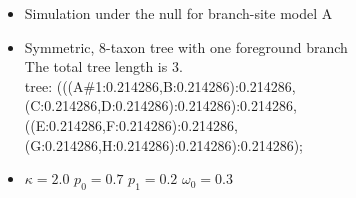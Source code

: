 \documentclass[12pt,letterpaper]{article}\usepackage[]{graphicx}\usepackage[]{color}
\newenvironment{knitrout}{}{} %
\begin{document}
\begin{itemize}
\item Simulation under the null for branch-site model A
\item Symmetric, 8-taxon tree with one foreground branch \\
  The total tree length is 3.\\
  tree: (((A\#1:0.214286,B:0.214286):0.214286,(C:0.214286,D:0.214286):0.214286):0.214286,((E:0.214286,F:0.214286):0.214286,(G:0.214286,H:0.214286):0.214286):0.214286);
\item $\kappa=2.0$ $p_0=0.7$ $p_{1}=0.2$ $\omega_0=0.3$
\end{itemize}

\begin{knitrout}
\color{fgcolor}


\end{knitrout}
\end{document}
